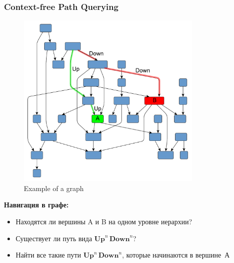 \documentclass[xcolor=table,english]{beamer}
\begin{document}
\begin{frame}[fragile] \frametitle{Context-free Path Querying}
    \begin{minipage}[m]{0.45\linewidth}
        \begin{figure}
            \centering
            \includegraphics[width=0.8\textwidth]{pictures/hierarchical.pdf}
            \caption{Example of a graph}
        \end{figure}
    \end{minipage}\hfill
    \begin{minipage}[m]{0.55\linewidth}
        \textbf{Навигация в графе:}
        \begin{itemize}
            \item Находятся ли вершины A и B на одном уровне иерархии?
            \item Существует ли путь вида $\textbf{Up}^n \, \textbf{Down}^n$?
            \item Найти все такие пути $\textbf{Up}^n \, \textbf{Down}^n$, которые начинаются в вершине~А
        \end{itemize}
    \end{minipage}
\end{frame}
\end{document}
